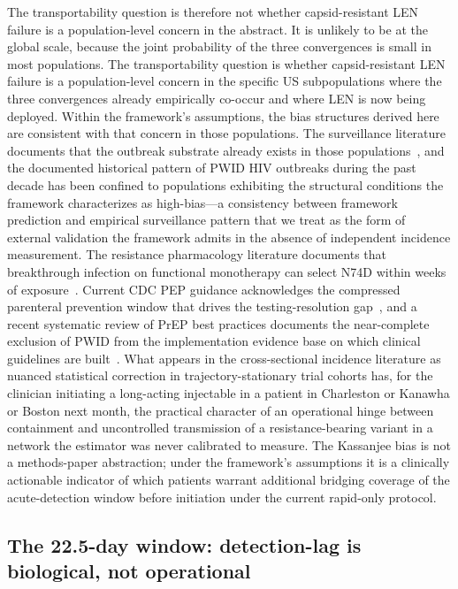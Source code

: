 \documentclass[11pt]{article}
\begin{document}
The transportability question is therefore not whether capsid-resistant LEN failure is a population-level concern in the abstract. It is unlikely to be at the global scale, because the joint probability of the three convergences is small in most populations. The transportability question is whether capsid-resistant LEN failure is a population-level concern in the specific US subpopulations where the three convergences already empirically co-occur and where LEN is now being deployed. Within the framework's assumptions, the bias structures derived here are consistent with that concern in those populations. The surveillance literature documents that the outbreak substrate already exists in those populations~\cite{cdc220counties,strathdee2020plus,desjarlais2022nyc}, and the documented historical pattern of PWID HIV outbreaks during the past decade has been confined to populations exhibiting the structural conditions the framework characterizes as high-bias---a consistency between framework prediction and empirical surveillance pattern that we treat as the form of external validation the framework admits in the absence of independent incidence measurement. The resistance pharmacology literature documents that breakthrough infection on functional monotherapy can select N74D within weeks of exposure~\cite{wirden2024n74d,pennetzdorfer2026}. Current CDC PEP guidance acknowledges the compressed parenteral prevention window that drives the testing-resolution gap~\cite{tanner2025pep}, and a recent systematic review of PrEP best practices documents the near-complete exclusion of PWID from the implementation evidence base on which clinical guidelines are built~\cite{kamitani2024systematic}. What appears in the cross-sectional incidence literature as nuanced statistical correction in trajectory-stationary trial cohorts has, for the clinician initiating a long-acting injectable in a patient in Charleston or Kanawha or Boston next month, the practical character of an operational hinge between containment and uncontrolled transmission of a resistance-bearing variant in a network the estimator was never calibrated to measure. The Kassanjee bias is not a methods-paper abstraction; under the framework's assumptions it is a clinically actionable indicator of which patients warrant additional bridging coverage of the acute-detection window before initiation under the current rapid-only protocol.

\subsection{The 22.5-day window: detection-lag is biological, not operational}
\end{document}
